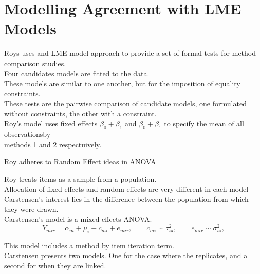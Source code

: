 \documentclass[12pt, a4paper]{report}
\theoremstyle{plain}
\theoremstyle{definition}
\theoremstyle{remark}
\begin{document}
\section{Modelling Agreement with LME Models}



Roys uses and LME model approach to provide a set of formal tests for method comparison studies.\\

Four candidates models are fitted to the data.\\

These models are similar to one another, but for the imposition of equality constraints.\\

These tests are the pairwise comparison of candidate models, one formulated without constraints, the other with a constraint.\\


Roy's model uses fixed effects $\beta_0 + \beta_1$ and $\beta_0 + \beta_1$ to specify the mean of all observationsby \\ methods 1 and 2 respectuively.





Roy adheres to Random Effect ideas in ANOVA

Roy treats items as a sample from a population.\\

Allocation of fixed effects and random effects are very different in each model\\

Carstensen's interest lies in the difference between the population from which they were drawn.\\

Carstensen's model is a mixed effects ANOVA.\\

\[
Y_{mir}  =  \alpha_m + \mu_i + c_{mi} + e_{mir}, \qquad c_{mi} \sim \mathcal{\tau^2_m}, \qquad e_{mir} \sim \mathcal{\sigma^2_m},
\]

This model includes a method by item iteration term.\\

Carstensen presents two models. One for the case where the replicates, and a second for when they are linked.\\
\end{document}
